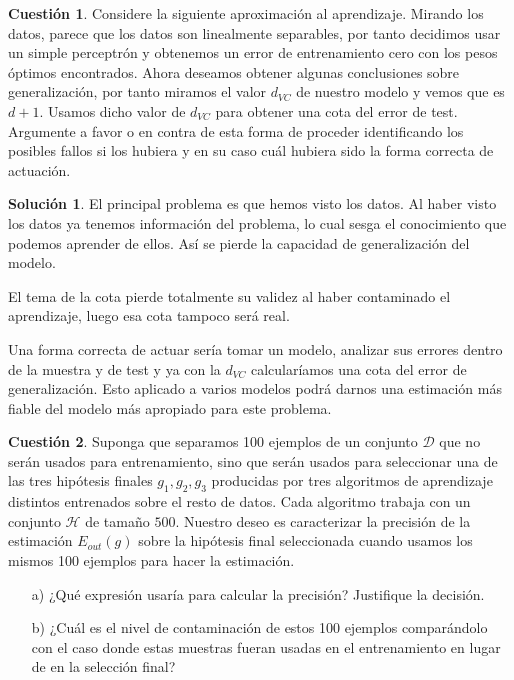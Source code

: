 \documentclass[a4paper, 11pt]{article}
\theoremstyle{definition}
\newtheorem{cuestion}{Cuestión}
\newtheorem*{solucion}{Solución}
\begin{document}
  \begin{cuestion}
    Considere la siguiente aproximación al aprendizaje. Mirando los datos, parece que los datos son linealmente separables, por tanto decidimos usar un simple perceptrón y obtenemos un error de entrenamiento cero con los pesos óptimos encontrados. Ahora deseamos obtener algunas conclusiones sobre generalización, por tanto miramos el valor $d_{VC}$ de nuestro modelo y vemos que es $d+1$. Usamos dicho valor de $d_{VC}$ para obtener una cota del error de test. Argumente a favor o en contra de esta forma de proceder identificando los posibles fallos si los hubiera y en su caso cuál hubiera sido la forma correcta de actuación.
  \end{cuestion}

  \begin{solucion}
    El principal problema es que hemos visto los datos. Al haber visto los datos ya tenemos información del problema, lo cual sesga el conocimiento que podemos aprender de ellos. Así se pierde la capacidad de generalización del modelo.

    El tema de la cota pierde totalmente su validez al haber contaminado el aprendizaje, luego esa cota tampoco será real.

    Una forma correcta de actuar sería tomar un modelo, analizar sus errores dentro de la muestra y de test y ya con la $d_{VC}$ calcularíamos una cota del error de generalización. Esto aplicado a varios modelos podrá darnos una estimación más fiable del modelo más apropiado para este problema.
  \end{solucion}

  \begin{cuestion}
    Suponga que separamos 100 ejemplos de un conjunto $\mathcal{D}$ que no serán usados para entrenamiento, sino que serán usados para seleccionar una de las tres hipótesis finales $g_1,g_2,g_3$ producidas por tres algoritmos de aprendizaje distintos entrenados sobre el resto de datos. Cada algoritmo trabaja con un conjunto $\mathcal{H}$ de tamaño $500$. Nuestro deseo es caracterizar la precisión de la estimación $E_{out}(g)$ sobre la hipótesis final seleccionada cuando usamos los mismos 100 ejemplos para hacer la estimación.

    \begin{enumerate}
      \item[a)] ¿Qué expresión usaría para calcular la precisión? Justifique la decisión.
      \item[b)] ¿Cuál es el nivel de contaminación de estos 100 ejemplos comparándolo con el caso donde estas muestras fueran usadas en el entrenamiento en lugar de en la selección final?
    \end{enumerate}
  \end{cuestion}
\end{document}
